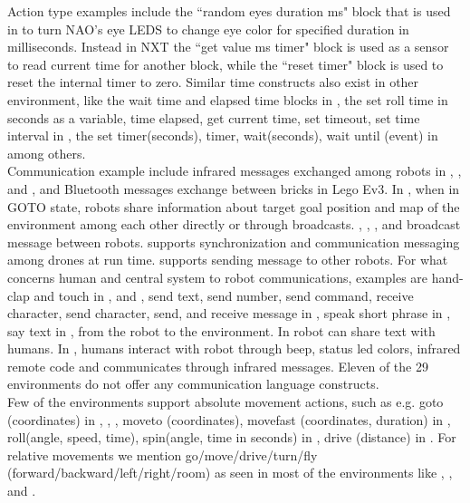 Action type examples include the ``random eyes duration ms" block that is used in \openroberta to turn NAO's eye LEDS to change eye color for specified duration in milliseconds. Instead in NXT the ``get value ms timer" block is used as a sensor to read current time for another block, while the ``reset timer" block is used to reset the internal timer to zero. Similar time constructs also exist in other environment, like the wait time and elapsed time blocks in \ardublockly, the set roll time in seconds as a variable, time elapsed, get current time, set timeout, set time interval in \sphero, the set timer(seconds), timer, wait(seconds), wait until (event) in \vex among others. \\

Communication example include infrared messages exchanged among robots in  \edison, \lego, and \openroberta, and Bluetooth messages exchange between bricks in Lego Ev3. In \missionlab, when in GOTO state, robots share information about target goal position and map of the environment among each other directly or through broadcasts. \sphero, \vex, \makeblock, and \tello broadcast message between robots. \flyaq supports synchronization and communication messaging among drones at run time.  \trik supports sending message to other robots. For what concerns human and central system to robot communications, examples are hand-clap and touch in \aseba, and \enchanting, send text, send number, send command, receive character, send character, send, and receive message in \tello, speak short phrase in \codelab, say text in \trik, \tivipe from the robot to the environment. In \choregraphe robot can share text with humans. In \arcbotics, humans interact with robot through beep, status led colors, infrared remote code and \picaxe communicates through infrared messages. Eleven of the 29 environments do not offer any communication language constructs. \\

Few of the environments support absolute movement actions, such as e.g. goto (coordinates) in \flyaq, \missionlab, \makeblock, moveto (coordinates), movefast (coordinates, duration) in \tivipe, roll(angle, speed, time), spin(angle, time in seconds) in \sphero, drive (distance) in \codelab. For relative movements we mention go/move/drive/turn/fly (forward/backward/left/right/room) as seen in most of the environments like \metabot, \trik, and \lego.

